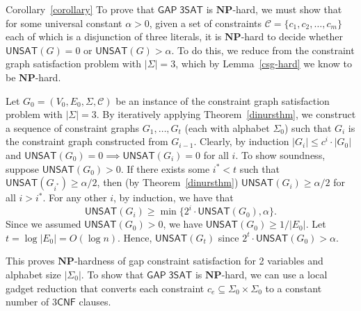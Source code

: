 \documentclass{article}
\newenvironment{proof_of}[1]{\noindent {\bf Proof of #1:}
	\hspace*{1mm}}{\hspace*{\fill} $\Box$ }
\newcommand{\class}[1]{\mathbf{#1}}
\newcommand{\NP}{\class{NP}}
\newcommand{\CNF}{\mathsf{CNF}}
\newcommand{\UNSAT}{\mathsf{UNSAT}}
\newcommand{\GAPSAT}{\mathsf{GAP\;3SAT}}
\begin{document}
\begin{proof_of}{Corollary~\ref{corollary}}
To prove that $\GAPSAT$ is $\NP$-hard, we must show that for some universal
constant $\alpha > 0$, given a set of constraints $\mathcal{C} = \{c_1, c_2, \dots, c_m\}$
each of which is a disjunction of three literals, it is $\NP$-hard to decide
whether $\UNSAT(G)=0$ or $\UNSAT(G)>\alpha$.
To do this, we reduce from the constraint graph satisfaction problem with
$|\Sigma| = 3$, which by Lemma~\ref{csg-hard} we know to be $\NP$-hard.

Let $G_0 = (V_0, E_0, \Sigma, \mathcal{C})$ be an instance of the constraint
graph satisfaction problem with $|\Sigma| = 3$.
By iteratively applying Theorem~\ref{dinursthm}, we construct a sequence
of constraint graphs $G_1, \dots, G_t$ (each with alphabet $\Sigma_0$) such
that $G_i$ is the constraint graph constructed from $G_{i-1}$.
Clearly, by induction $|G_i| \le c^i \cdot |G_0|$ and
$\UNSAT(G_0) = 0 \implies \UNSAT(G_i) = 0 $ for all $i$.
To show soundness, suppose $\UNSAT(G_0) > 0$.
If there exists some $i^* < t$ such that $\UNSAT(G_{i^*})\ge \alpha/2$,
then (by Theorem~\ref{dinursthm}) $\UNSAT(G_{i})\ge \alpha/2$ for all $i>i^*$.
For any other $i$, by induction, we have that
$$
\UNSAT(G_i) \ge \min \{2^i\cdot \UNSAT(G_0), \alpha\}.
$$
Since we assumed $\UNSAT(G_0) > 0$, we have $\UNSAT(G_0) \ge 1/|E_0|$.
Let $t = \log|E_0| = O(\log n)$.
Hence, $\UNSAT(G_t)$ since $2^t\cdot \UNSAT(G_0) > \alpha$.

This proves $\NP$-hardness of gap constraint satisfaction for
2 variables and alphabet size $|\Sigma_0|$.
To show that $\GAPSAT$ is $\NP$-hard, we can use a local gadget
reduction that converts each constraint $c_e \subseteq \Sigma_0 \times \Sigma_0$
to a constant number of 3$\CNF$ clauses.
\end{proof_of}\\
\end{document}
